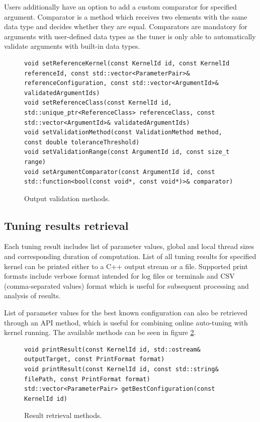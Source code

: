 \documentclass
[
    digital, %
    oneside, %
    table, %
    nolof, %
    nolot, %
    nocover %
]{fithesis3}
\begin{document}
Users additionally have an option to add a custom comparator for specified argument. Comparator is a method which receives two elements with the same
data type and decides whether they are equal. Comparators are mandatory for arguments with user-defined data types as the tuner is only able to
automatically validate arguments with built-in data types.

\begin{figure}
\begin{adjustwidth}{-1cm}{-1cm}
\begin{lstlisting}
void setReferenceKernel(const KernelId id, const KernelId referenceId, const std::vector<ParameterPair>& referenceConfiguration, const std::vector<ArgumentId>& validatedArgumentIds)
void setReferenceClass(const KernelId id, std::unique_ptr<ReferenceClass> referenceClass, const std::vector<ArgumentId>& validatedArgumentIds)
void setValidationMethod(const ValidationMethod method, const double toleranceThreshold)
void setValidationRange(const ArgumentId id, const size_t range)
void setArgumentComparator(const ArgumentId id, const std::function<bool(const void*, const void*)>& comparator)
\end{lstlisting}
\caption{Output validation methods.}
\label{ktt-validation-methods}
\end{adjustwidth}
\end{figure}

\subsection{Tuning results retrieval}
Each tuning result includes list of parameter values, global and local thread sizes and corresponding duration of computation. List of all tuning
results for specified kernel can be printed either to a C++ output stream or a file. Supported print formats include verbose format intended for log
files or terminals and CSV (comma-separated values) format which is useful for subsequent processing and analysis of results.

List of parameter values for the best known configuration can also be retrieved through an API method, which is useful for combining online
auto-tuning with kernel running. The available methods can be seen in figure \ref{ktt-result-methods}.

\begin{figure}
\begin{adjustwidth}{-1cm}{-1cm}
\begin{lstlisting}
void printResult(const KernelId id, std::ostream& outputTarget, const PrintFormat format)
void printResult(const KernelId id, const std::string& filePath, const PrintFormat format)
std::vector<ParameterPair> getBestConfiguration(const KernelId id)
\end{lstlisting}
\caption{Result retrieval methods.}
\label{ktt-result-methods}
\end{adjustwidth}
\end{figure}
\end{document}
